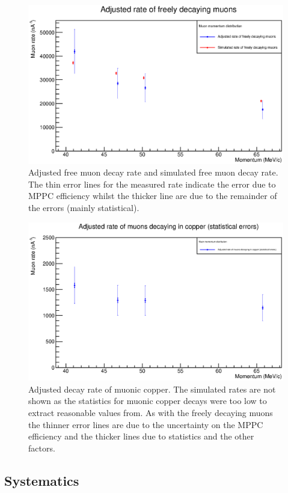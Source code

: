 \begin{figure}[hptb] 
  \centering
    \includegraphics[width=.9\textwidth]{images/plot_generating_scripts/adjusted_muon_rates.eps}
  \caption{Adjusted free muon decay rate and simulated free muon decay rate. The thin error lines for the measured rate indicate the error due to MPPC efficiency whilst the thicker line are due to the remainder of the errors (mainly statistical).}
  \label{fig:images_plot_generating_scripts_adjusted_muon_rates}
\end{figure}

\begin{figure}[hptb]
  \centering
    \includegraphics[width=.9\textwidth]{images/plot_generating_scripts/adjusted_muon_rates_cu.eps}
  \caption{Adjusted decay rate of muonic copper. The simulated rates are not shown as the statistics for muonic copper decays were too low to extract reasonable values from. As with the freely decaying muons the thinner error lines are due to the uncertainty on the MPPC efficiency and the thicker lines due to statistics and the other factors.}
  \label{fig:images_plot_generating_scripts_adjusted_muon_rates_cu}
\end{figure}

\subsection{Systematics} %
\label{sub:systematics}

% 



